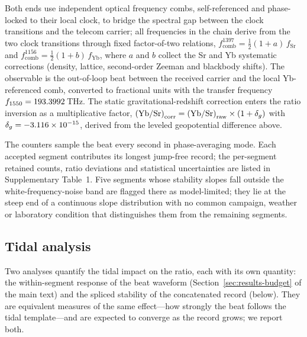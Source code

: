 Both ends use independent optical frequency combs, self-referenced
and phase-locked to their local clock, to bridge the spectral gap
between the clock transitions and the telecom carrier; all frequencies
in the chain derive from the two clock transitions through fixed
factor-of-two relations, $f_{\mathrm{comb}}^{1397} =
\tfrac{1}{2}(1+a)\,f_{\mathrm{Sr}}$ and $f_{\mathrm{comb}}^{1156} =
\tfrac{1}{2}(1+b)\,f_{\mathrm{Yb}}$, where $a$ and $b$ collect the Sr
and Yb systematic corrections (density, lattice, second-order Zeeman
and blackbody shifts). The observable is the
out-of-loop beat between the received carrier and the local
Yb-referenced comb, converted to fractional units with the transfer
frequency $f_{1550} = 193.3992$\,THz. The static
gravitational-redshift correction enters the ratio inversion as a
multiplicative factor,
$\left(\mathrm{Yb/Sr}\right)_{\rm corr}
= \left(\mathrm{Yb/Sr}\right)_{\rm raw} \times (1+\delta_g)$ with
$\delta_g = -3.116\times10^{-15}$, derived from the leveled geopotential
difference above.

The counters sample the beat every second in phase-averaging mode.
Each accepted segment contributes its longest jump-free record; the
per-segment retained counts, ratio deviations and statistical
uncertainties are listed in Supplementary Table~1. Five segments
whose stability slopes fall outside the white-frequency-noise band
are flagged there as model-limited; they lie at the steep end of a
continuous slope distribution with no common campaign, weather or
laboratory condition that distinguishes them from the remaining
segments.

\subsection*{Tidal analysis}

Two analyses quantify the tidal impact on the ratio, each with its
own quantity: the within-segment response of the beat waveform
(Section~\ref{sec:results-budget} of the main text) and the spliced
stability of the concatenated record (below). They are equivalent
measures of the same effect---how strongly the beat follows the tidal
template---and are expected to converge as the record grows; we
report both.

